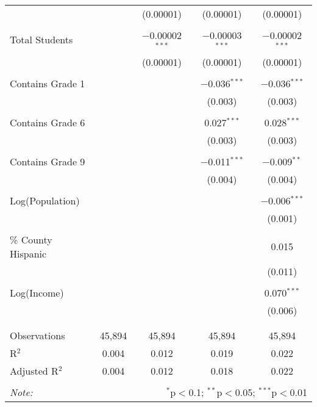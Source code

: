 \begin{table}[!htbp]
\begin{tabular}{@{\extracolsep{-2pt}}lcccc}
  &  & (0.00001) & (0.00001) & (0.00001) \\ 
  & & & & \\ 
 Total Students &  & $-$0.00002$^{***}$ & $-$0.00003$^{***}$ & $-$0.00002$^{***}$ \\ 
  &  & (0.00001) & (0.00001) & (0.00001) \\ 
  & & & & \\ 
 Contains Grade 1 &  &  & $-$0.036$^{***}$ & $-$0.036$^{***}$ \\ 
  &  &  & (0.003) & (0.003) \\ 
  & & & & \\ 
 Contains Grade 6 &  &  & 0.027$^{***}$ & 0.028$^{***}$ \\ 
  &  &  & (0.003) & (0.003) \\ 
  & & & & \\ 
 Contains Grade 9 &  &  & $-$0.011$^{***}$ & $-$0.009$^{**}$ \\ 
  &  &  & (0.004) & (0.004) \\ 
  & & & & \\ 
 Log(Population) &  &  &  & $-$0.006$^{***}$ \\ 
  &  &  &  & (0.001) \\ 
  & & & & \\ 
 \% County Hispanic &  &  &  & 0.015 \\ 
  &  &  &  & (0.011) \\ 
  & & & & \\ 
 Log(Income) &  &  &  & 0.070$^{***}$ \\ 
  &  &  &  & (0.006) \\ 
  & & & & \\ 
\hline \\[-1.8ex] 
Observations & 45,894 & 45,894 & 45,894 & 45,894 \\ 
R$^{2}$ & 0.004 & 0.012 & 0.019 & 0.022 \\ 
Adjusted R$^{2}$ & 0.004 & 0.012 & 0.018 & 0.022 \\ 
\hline 
\hline \\[-1.8ex] 
\textit{Note:}  & \multicolumn{4}{r}{$^{*}$p$<$0.1; $^{**}$p$<$0.05; $^{***}$p$<$0.01} \\ 
\end{tabular} 
\end{table} 
